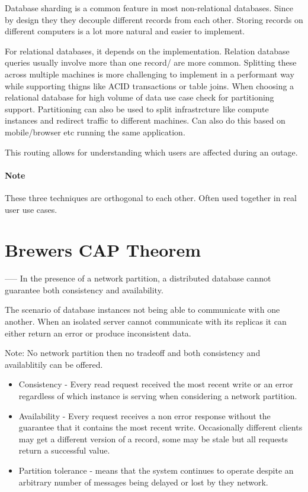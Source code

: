 \documentclass[a4paper, 11pt]{book}
\begin{document}
    Database sharding is a common feature in most non-relational databases.
    Since by design they they decouple different records from each other.
    Storing records on different computers is a lot more natural and easier to implement.

    For relational databases, it depends on the implementation.
    Relation database queries usually involve more than one record/ are more common.
    Splitting these across multiple machines is more challenging to implement in a performant way while supporting thigns like ACID transactions or table joins.
    When choosing a relational database for high volume of data use case check for partitioning support.
    Partitioning can also be used to split infrastrcture like compute instances and redirect traffic to different machines.
    Can also do this based on mobile/browser etc running the same application.

    This routing allows for understanding which users are affected during an outage.

    \paragraph{Note}
    These three techniques are orthogonal to each other. Often used together in real user use cases.


    \section{Brewers CAP Theorem}

    ----- In the presence of a network partition, a distributed database cannot guarantee both consistency and availability.

    The scenario of database instances not being able to communicate with one another.
    When an isolated server cannot communicate with its replicas it can either return an error or produce inconsistent data.

    Note: No network partition then no tradeoff and both consistency and availablitily can be offered.

    \begin{itemize}
        \item Consistency - Every read request received the most recent write or an error regardless of which instance is serving when considering a network partition.
        \item Availability - Every request receives a non error response without the guarantee that it contains the most recent write.
        Occasionally different clients may get a different version of a record, some may be stale but all requests return a successful value.
        \item Partition tolerance - means that the system continues to operate despite an arbitrary number of messages being delayed or lost by they network.
    \end{itemize}
\end{document}
